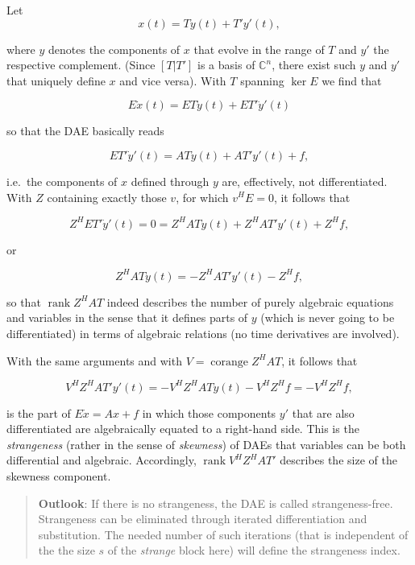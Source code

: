 \documentclass[]{book}
\theoremstyle{definition}
\theoremstyle{definition}
\theoremstyle{definition}
\theoremstyle{remark}
\begin{document}
Let
\[x(t) = Ty(t) + T'y'(t),\]

where \(y\) denotes the components of \(x\) that evolve in the range of \(T\) and \(y'\) the respective complement. (Since \([T|T']\) is a basis of \(\mathbb C^{n}\), there exist such \(y\) and \(y'\) that uniquely define \(x\) and vice versa). With \(T\) spanning \(\ker E\) we find that

\[E \dot x(t) = ET\dot y(t) + ET'\dot y'(t)\]

so that the DAE basically reads

\[ET'\dot y'(t) = ATy(t) + AT'y'(t)+f,\]

i.e.~the components of \(x\) defined through \(y\) are, effectively, not differentiated. With \(Z\) containing exactly those \(v\), for which \(v^HE=0\), it follows that

\[Z^HET'\dot y'(t) = 0 = Z^HATy(t) + Z^HAT'y'(t)+Z^Hf,\]

or

\[Z^HATy(t) = -Z^HAT'y'(t)-Z^Hf,\]

so that \(\operatorname{rank}Z^HAT\) indeed describes the number of purely algebraic equations and variables in the sense that it defines parts of \(y\) (which is never going to be differentiated) in terms of algebraic relations (no time derivatives are involved).

With the same arguments and with \(V=\operatorname{corange}Z^HAT\), it follows that

\[V^HZ^HAT'y'(t) = -V^HZ^HATy(t) -V^HZ^Hf=-V^HZ^Hf,\]

is the part of \(E\dot x = Ax + f\) in which those components \(y'\) that are also differentiated are algebraically equated to a right-hand side. This is the \emph{strangeness} (rather in the sense of \emph{skewness}) of DAEs that variables can be both differential and algebraic. Accordingly, \(\operatorname{rank}V^HZ^HAT'\) describes the size of the skewness component.

\begin{quote}
\textbf{Outlook}: If there is no strangeness, the DAE is called strangeness-free. Strangeness can be eliminated through iterated differentiation and substitution. The needed number of such iterations (that is independent of the the size \(s\) of the \emph{strange} block here) will define the strangeness index.
\end{quote}
\end{document}
